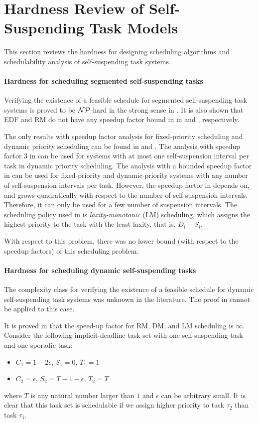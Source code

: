 \section{Hardness Review of Self-Suspending Task Models}
This section reviews the hardness for designing scheduling algorithms and schedulability analysis of self-suspending task systems. 

\paragraph{Hardness for scheduling segmented self-suspending tasks}
Verifying the existence of a feasible schedule for segmented self-suspending task systems is proved to be ${\cal NP}$-hard in the strong sense in \cite{Ridouard_2004}. It is also shown that EDF and RM do not have any speedup factor bound in in \cite{Ridouard_2004} and \cite{RTSS-ChenL14}, respectively. 

The only results with speedup factor analysis for fixed-priority scheduling and dynamic priority scheduling can be found in \cite{RTSS-ChenL14} and \cite{WC16-suspend-DATE}. The analysis with speedup factor $3$ in \cite{RTSS-ChenL14} can be used for systems with at most one self-suspension interval per task in dynamic priority scheduling. The analysis with a bounded speedup factor in \cite{WC16-suspend-DATE} can be used for fixed-priority and dynamic-priority systems with any number of self-suspension intervals per task. However, the speedup factor in \cite{WC16-suspend-DATE} depends on, and grows quadratically with respect to the number of self-suspension intervals. Therefore, it can only be used for a few number of suspension intervals. The scheduling policy used in \cite{WC16-suspend-DATE} is \emph{laxity-monotonic} (LM) scheduling, which assigns the highest priority to the task with the least laxity, that is, $D_i-S_i$.


With respect to this problem, there was no lower bound (with respect to the speedup factors) of this scheduling problem. 

\paragraph{Hardness for scheduling dynamic self-suspending tasks}
The complexity class for verifying the existence of a feasible schedule for dynamic self-suspending task systems was unknown in the literature. The proof in \cite{Ridouard_2004} cannot be applied to this case. 

It is proved in \cite{huangpass:dac2015} that the speed-up factor for RM, DM, and LM scheduling is $\infty$. Consider the following implicit-deadline task set with one self-suspending task and one sporadic task:
\begin{itemize}
 \setlength\itemsep{0em}
\item $C_1=1-2\epsilon$, $S_1=0$, $T_1=1$
\item  $C_2=\epsilon$, $S_2=T-1-\epsilon$, $T_2=T$
\end{itemize}
where $T$ is any natural number larger than $1$ and $\epsilon$ can be arbitrary small.
It is clear that this task set is schedulable if we assign higher priority to
task $\tau_2$ than task $\tau_1$.


